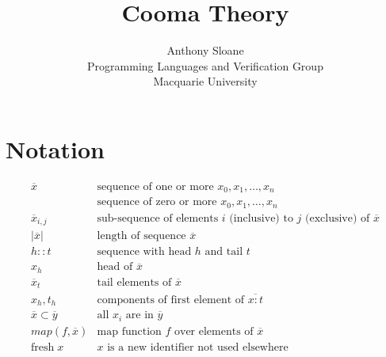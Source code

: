 \documentclass[11pt]{article}
\begin{document}
\title{Cooma Theory}

\author{
Anthony Sloane \\
Programming Languages and Verification Group \\
Macquarie University
}

\maketitle

\section{Notation}

\newcommand{\fresh}[1]{\mathrm{fresh}\;#1}
\newcommand{\cons}[2]{\mathit{#1 :: #2}}
\newcommand{\len}[1]{\lvert #1 \rvert}
\newcommand{\map}[2]{\mathit{map}(#1, #2)}
\newcommand{\repo}[1]{\overline{#1}}
\newcommand{\repz}[1]{[\ \repo{#1}\ ]}
\newcommand{\sub}[3]{#1_{#2,#3}}
\newcommand{\subs}[2]{#1 \subset #2}

\newcommand{\arge}[2]{#1 : #2}
\newcommand{\flde}[2]{#1 = #2}
\newcommand{\flds}[2]{\repz{\flde{#1}{#2}}}

\[
\begin{array}{ll}
\repo{x}                 & \text{sequence of one or more $x_0, x_1, \ldots, x_n$} \\
\repz{x}                 & \text{sequence of zero or more $x_0, x_1, \ldots, x_n$} \\
\sub{\repo{x}}{i}{j}     & \text{sub-sequence of elements $i$ (inclusive) to $j$ (exclusive) of $\repo{x}$} \\
\len{\repo{x}}           & \text{length of sequence $\repo{x}$} \\
\cons{h}{t}              & \text{sequence with head $h$ and tail $t$} \\
x_h                      & \text{head of $\repo{x}$} \\
\repo{x}_t               & \text{tail elements of $\repo{x}$} \\
x_h, t_h                 & \text{components of first element of $\repo{\arge{x}{t}}$} \\
\subs{\repo{x}}{\repo{y}} & \text{all $x_i$ are in $\repo{y}$} \\
\map{f}{\repo{x}}         & \text{map function $f$ over elements of $\repo{x}$} \\
\fresh{x}                 & \text{$x$ is a new identifier not used elsewhere} \\
\end{array}
\]
\end{document}
